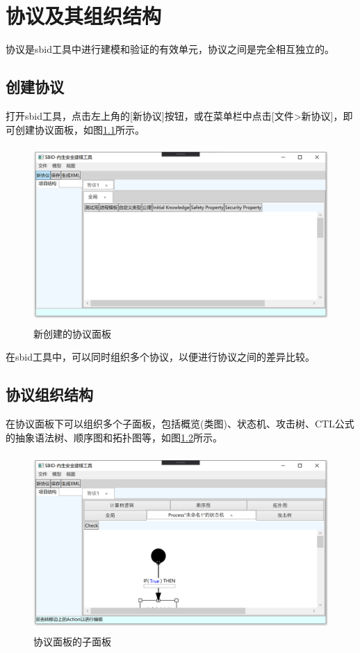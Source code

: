 \chapter{协议及其组织结构}

协议是sbid工具中进行建模和验证的有效单元，协议之间是完全相互独立的。

\section{创建协议}
打开sbid工具，点击左上角的[新协议]按钮，或在菜单栏中点击[文件>新协议]，即可创建协议面板，如图\ref{create_protocol}所示。
    \begin{figure}[h]
	\centering
	\includegraphics[width=12cm,height=6.75cm]{imgs/create_protocol.png}
	\caption{新创建的协议面板}
	\label{create_protocol}
	\end{figure}
\par
在sbid工具中，可以同时组织多个协议，以便进行协议之间的差异比较。

\section{协议组织结构}
在协议面板下可以组织多个子面板，包括概览(类图)、状态机、攻击树、CTL公式的抽象语法树、顺序图和拓扑图等，如图\ref{protocol_subpanels}所示。
    \begin{figure}[h]
	\centering
	\includegraphics[width=12cm,height=6.75cm]{imgs/protocol_subpanels.png}
	\caption{协议面板的子面板}
	\label{protocol_subpanels}
	\end{figure}